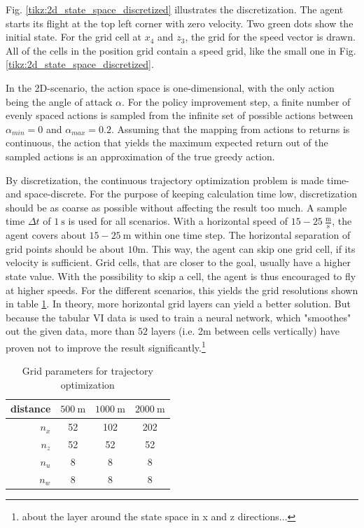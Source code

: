 Fig. \ref{tikz:2d_state_space_discretized} illustrates the discretization. The agent starts its flight at the top left corner with zero velocity. Two green dots show the initial state. For the grid cell at $x_4$ and $z_3$, the grid for the speed vector is drawn. All of the cells in the position grid contain a speed grid, like the small one in Fig. \ref{tikz:2d_state_space_discretized}.

In the 2D-scenario, the action space is one-dimensional, with the only action being the angle of attack $\alpha$. For the policy improvement step, a finite number of evenly spaced actions is sampled from the infinite set of possible actions between $\alpha_{min} = 0$ and $\alpha_{max}=0.2$. Assuming that the mapping from actions to returns is continuous, the action that yields the maximum expected return out of the sampled actions is an approximation of the true greedy action.

By discretization, the continuous trajectory optimization problem is made time- and space-discrete. For the purpose of keeping calculation time low, discretization should be as coarse as possible without affecting the result too much. A sample time $\Delta t$ of $1~\text{s}$ is used for all scenarios. With a horizontal speed of $15-25 ~\frac{\text{m}}{\text{s}}$, the agent covers about $15-25~\text{m}$ within one time step. The horizontal separation of grid points should be about $10$m. This way, the agent can skip one grid cell, if its velocity is sufficient. Grid cells, that are closer to the goal, usually have a higher state value. With the possibility to skip a cell, the agent is thus encouraged to fly at higher speeds. For the different scenarios, this yields the grid resolutions shown in table \ref{tab:grids}. In theory, more horizontal grid layers can yield a better solution. But because the tabular VI data is used to train a neural network, which "smoothes" out the given data, more than $52$ layers (i.e. 2m between cells vertically) have proven not to improve the result significantly.\footnote{about the layer around the state space in x and z directions...}

\begin{table}
	\begin{center}
		\begin{tabular}{r|c c c}
			distance & $500~\text{m}$ & $1000~\text{m}$ & $2000~\text{m}$ \\ \hline
			$n_x$ & 52 & 102 & 202 \\
			$n_z$ & 52 & 52 & 52\\
			$n_u$ & 8 & 8 & 8 \\
			$n_w$ & 8 & 8 & 8
		\end{tabular}
	\end{center}
	\caption{Grid parameters for trajectory optimization}
	\label{tab:grids}
\end{table}

